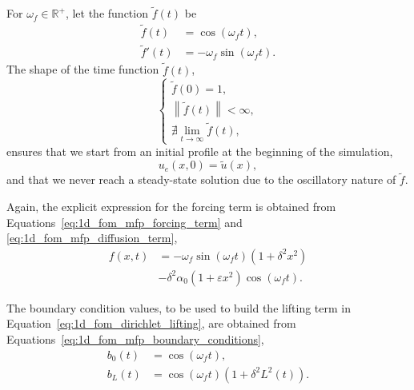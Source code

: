 \documentclass[../main.tex]{subfiles}
\begin{document}
For $\omega_f \in \mathbb{R}^{+}$, let the function $\tilde{f}(t)$ be
\begin{subequations}
    \begin{align}
        \tilde{f}(t) &= \cos{(\omega_f t)}, \\ 
        \tilde{f}'(t) &= -\omega_f \sin{(\omega_f t)}.
    \end{align}    
\end{subequations}
The shape of the time function $\tilde{f}(t)$,
\begin{equation*}
    \begin{cases}
    \tilde{f}(0) = 1, \\ 
    \left\|\tilde{f}(t)\right\| < \infty, \\ 
    \nexists \lim_{t \rightarrow \infty} \tilde{f}(t),
    \end{cases}
\end{equation*}
ensures that we start from an initial profile at the beginning of the simulation,
\begin{equation}
    u_e(x,0) = \tilde{u}(x),
\end{equation}
and that we never reach a steady-state solution due to the oscillatory nature of $\tilde{f}$.

Again, the explicit expression for the forcing term is obtained from Equations~\eqref{eq:1d_fom_mfp_forcing_term} and \eqref{eq:1d_fom_mfp_diffusion_term},
\begin{equation}
    \begin{split}
        f(x,t) &= -\omega_f \sin{(\omega_f t)}(1+\delta^2 x^2) \\ 
        &- \delta^2 \alpha_0(1 + \varepsilon x^2) \cos{(\omega_f t)}.
    \end{split}
\end{equation}

The boundary condition values, to be used to build the lifting term in Equation~\eqref{eq:1d_fom_dirichlet_lifting}, are obtained from Equations~\eqref{eq:1d_fom_mfp_boundary_conditions},
\begin{subequations}
    \begin{align}
        b_0(t) &= \cos{(\omega_f t)}, \\
        b_L(t) &= \cos{(\omega_f t)}\left(1 + \delta^2 L^{2}(t)\right).
    \end{align}
\end{subequations}
\end{document}
